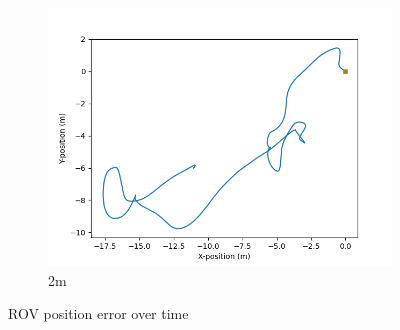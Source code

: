 \documentclass[class=article, crop=false]{standalone}
\begin{document}
\begin{figure}
\begin{subfigure}[b]{0.48\textwidth}
        \includegraphics{scenario1/rov-0m/2.0m/usv_position_controlled}
        \caption{2m}
        \label{}
    \end{subfigure}

    \caption{ROV position error over time}
\end{figure}
\end{document}

